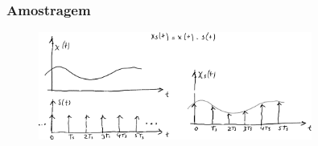 \begin{frame}%
  \frametitle{Amostragem}

  \begin{figure}[h]
  \centering
  \includegraphics[width=0.8\textwidth]{images/amostragem.pdf}
  \label{fig-amostragem}
  \end{figure}

\end{frame}

